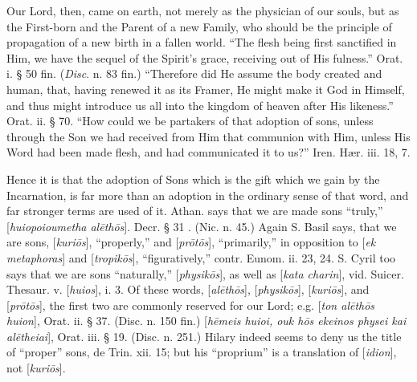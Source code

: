 Our Lord, then, came on earth, not merely as the
physician of our souls, but as the First-born and the Parent of a new
Family, who should be the principle of propagation of a new birth in a
fallen world. ``The flesh being first sanctified in Him, we have the
sequel of the Spirit's grace, receiving out of His fulness.'' Orat. i.
§ 50 fin. (\emph{Disc}. n.
83 fin.) ``Therefore did He assume the body created and human, that,
having renewed it as its Framer, He might make it God in Himself, and
thus might introduce us all into the kingdom of heaven after His
likeness.'' Orat. ii. § 70.
``How could we be partakers of that adoption of sons, unless through
the Son we had received from Him that communion with Him, unless His
Word had been made flesh, and had communicated it to us?'' Iren. Hær.
iii. 18, 7.

Hence it is that the adoption of Sons which is
the gift which we gain by the Incarnation, is far more than an
adoption in the ordinary sense of that word, and far stronger terms
are used of it. Athan. says that we are made sons ``truly,'' [\emph{huiopoioumetha
al\={e}th\={o}s}]. Decr. § 31 . (Nic. n. 45.) Again S. Basil
says, that we are sons, [\emph{kuri\={o}s}], ``properly,'' and [\emph{pr\={o}t\={o}s}],
``primarily,'' in opposition to [\emph{ek metaphoras}] and [\emph{tropik\={o}s}],
``figuratively,'' contr. Eunom. ii. 23, 24. S. Cyril too says that we
are sons ``naturally,'' [\emph{physik\={o}s}], as well as [\emph{kata
charin}], vid. Suicer. Thesaur. v. [\emph{huios}], i. 3. Of these
words, [\emph{al\={e}th\={o}s}], [\emph{physik\={o}s}], [\emph{kuri\={o}s}],
and [\emph{pr\={o}t\={o}s}], the first two are commonly reserved
for our Lord; e.g. [\emph{ton al\={e}th\={o}s huion}], Orat. ii.
§ 37. (Disc. n. 150 fin.) [\emph{h\={e}meis huioi, ouk h\={o}s
ekeinos physei kai al\={e}theiai}], Orat. iii. § 19. (Disc. n.
251.) Hilary indeed seems to deny us the title of ``proper'' sons, de
Trin. xii. 15; but his ``proprium'' is a translation of [\emph{idion}],
not [\emph{kuri\={o}s}].

